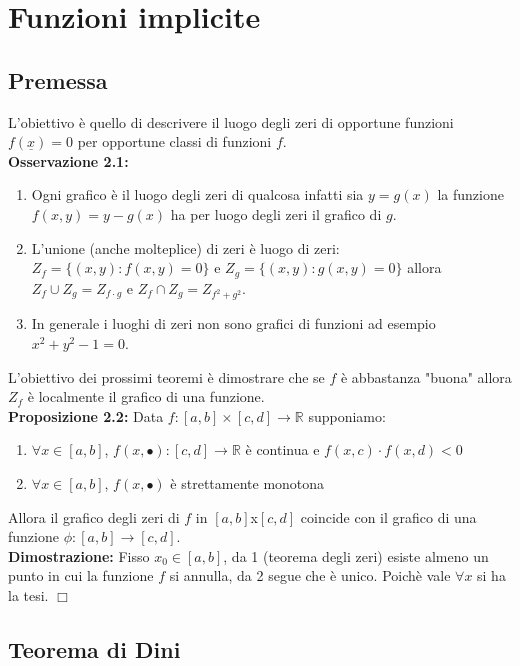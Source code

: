 \documentclass[a4paper,11pt,titlepage]{book}
\begin{document}
\chapter{Funzioni implicite}

\section{Premessa}

L'obiettivo è quello di descrivere il luogo degli zeri di opportune funzioni $f(\underline{x})=0$ per opportune classi di funzioni $f$.\\

\textbf{Osservazione 2.1:} \begin{enumerate}
\item Ogni grafico è il luogo degli zeri di qualcosa infatti sia $y=g(x)$ la funzione $f(x,y)=y-g(x)$ ha per luogo degli zeri il grafico di $g$.
\item L'unione (anche molteplice) di zeri è luogo di zeri: $Z_f=\{(x,y):f(x,y)=0\}$ e $Z_g=\{(x,y):g(x,y)=0\}$ allora $Z_f \cup Z_g = Z_{f\cdot g}$ e  $Z_f \cap Z_g = Z_{f^2+g^2}$.
\item In generale i luoghi di zeri non sono grafici di funzioni ad esempio $x^2+y^2-1=0$.
\end{enumerate}

L'obiettivo dei prossimi teoremi è dimostrare che se $f$ è abbastanza "buona" allora $Z_f$ è localmente il grafico di una funzione.\\

\textbf{Proposizione 2.2:} Data $f:[a,b]\times[c,d]\to\mathbb{R}$ supponiamo:\begin{enumerate}
\item $\forall x \in [a,b]$, $f(x,\bullet):[c,d]\to\mathbb{R}$ è continua e $f(x,c)\cdot f(x,d)<0$
\item $\forall x \in [a,b]$, $f(x,\bullet)$ è strettamente monotona
\end{enumerate}
Allora il grafico degli zeri di $f$ in $[a,b]$x$[c,d]$ coincide con il grafico di una funzione $\phi: [a,b]\to[c,d]$.\\

\textbf{Dimostrazione:} Fisso $x_0\in[a,b]$, da 1 (teorema degli zeri) esiste almeno un punto in cui la funzione $f$ si annulla, da 2 segue che è unico. Poichè vale $\forall x$ si ha la tesi. $\Box$ \\

\section{Teorema di Dini}
\end{document}
